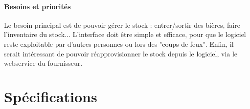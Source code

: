 \documentclass[a4paper,oneside]{article}
\begin{document}
\paragraph{Besoins et priorités\\}
Le besoin principal est de pouvoir gérer le stock : entrer/sortir des bières, faire l'inventaire du stock...
L'interface doit être simple et efficace, pour que le logiciel reste exploitable par d'autres personnes ou lors des "coups de feux".
Enfin, il serait intéressant de pouvoir réapprovisionner le stock depuis le logiciel, via le webservice du fournisseur.



\newpage

\section{Spécifications}
\end{document}
